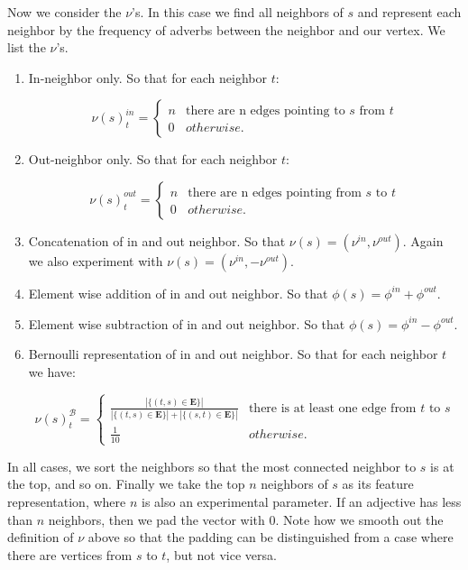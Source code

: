 Now we consider the $\nu$'s. In this case we find all neighbors of $s$ and represent each neighbor by the frequency of adverbs between the neighbor and our vertex. We list the $\nu$'s.

\begin{enumerate}
	\item In-neighbor only. So that for each neighbor $t$:

		\[   
		\nu(s)^{in}_t = \left\{
		\begin{array}{ll}
		      n & \text{there are n edges pointing to $s$ from $t$} \\
		      0 & otherwise.
		\end{array} 
		\right.
		\]

	\item Out-neighbor only. So that for each neighbor $t$:

		\[   
		\nu(s)^{out}_t = \left\{
		\begin{array}{ll}
		      n & \text{there are n edges pointing from $s$ to $t$} \\
		      0 & otherwise.
		\end{array} 
		\right. 
		\]

	\item Concatenation of in and out neighbor. So that $\nu(s) = (\nu^{in}, \nu^{out})$. Again we also experiment with $\nu(s) = (\nu^{in}, -\nu^{out})$.

	\item Element wise addition of in and out neighbor. So that $\phi(s) = \phi^{in} + \phi^{out}$.
	
	\item Element wise subtraction of in and out neighbor. So that $\phi(s) = \phi^{in} - \phi^{out}$.

	\item Bernoulli representation of in and out neighbor. So that for each neighbor $t$ we have:

		\[   
			\nu(s)^{\mathcal{B}}_t = \left\{
			\begin{array}{ll}
			      \frac{|\{(t,s) \in \pmb{E}\}|}{|\{(t,s) \in \pmb{E}\}| + |\{(s,t) \in \pmb{E}\}|} & \text{there is at least one edge from $t$ to $s$} \\
			      \frac{1}{10} & otherwise.
			\end{array} 
			\right. 
		\]

\end{enumerate}

In all cases, we sort the neighbors so that the most connected neighbor to $s$ is at the top, and so on. Finally we take the top $n$ neighbors of $s$ as its feature representation, where $n$ is also an experimental parameter. If an adjective has less than $n$ neighbors, then we pad the vector with $0$. Note how we smooth out the definition of $\nu$ above so that the padding can be distinguished from a case where there are vertices from $s$ to $t$, but not vice versa.


